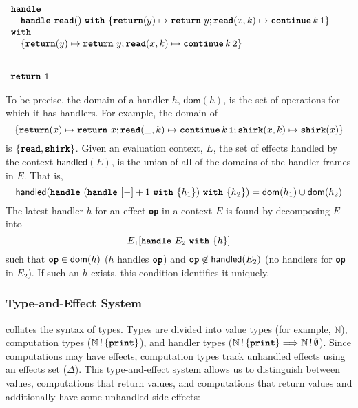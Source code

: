 \begin{eff}
$\begin{array}{l}
  \textbf{\texttt{handle}} \\
  \quad \handleWith{\textbf{\texttt{read}}()}{\returnHandler{y}{\return{y}}; \textbf{\texttt{read}}(x, k) \mapsto {\continue{k}{\texttt{1}}}} \\
  \textbf{\texttt{with}} \\ 
  \quad \{ \returnHandler{y}{\return{y}}; \textbf{\texttt{read}}(x, k) \mapsto {\continue{k}{\texttt{2}}} \}
\end{array}$ 

\vspace{2mm} 
\textcolor{effComment}{\hrule height 0.2mm \relax}
\vspace{2mm} 

\textcolor{effComment}{$\begin{array}{l}\return{\texttt{1}}\end{array}$}
\end{eff}

To be precise, the domain of a handler $h$, $\textsf{dom}(h)$, is the set of operations for which it has handlers. For example, the domain of 
\[\{ \returnHandler{x}{\return{x}}; \textbf{\texttt{read}}(\_, k) \mapsto \continue{k}{\texttt{1}}; \textbf{\texttt{shirk}}(x, k) \mapsto \textbf{\texttt{shirk}}(x)
\} \] 
is $\{ \textbf{\texttt{read}}, \textbf{\texttt{shirk}} \}$.
Given an evaluation context, $E$, the set of effects handled by the context $\textsf{handled}(E)$, is the union of all of the domains of the handler frames in $E$. That is, 
\[\textsf{handled}(\handleWith{(\handleWith{[-]+1}{h_1})}{h_2}) = \textsf{dom}(h_1) \cup \textsf{dom}(h_2)\]
The latest handler $h$ for an effect \textbf{\texttt{op}} in a context $E$ is found by decomposing $E$ into 
\[E_1[\handleWith{E_2}{h}]\]
such that $\textbf{\texttt{op}} \in \textsf{dom}(h)$ ($h$ handles $\textbf{\texttt{op}}$) and $\textbf{\texttt{op}} \not\in \textsf{handled}(E_2)$ (no handlers for \textbf{\texttt{op}} in $E_2$). If such an $h$ exists, this condition identifies it uniquely. 
\subsubsection{Type-and-Effect System}
 collates the syntax of \efflang{} types. Types are divided into value types (for example, $\mathbb{N}$), computation types ($\effectType[\{\textbf{\texttt{print}} \}]{\mathbb{N}}$), and handler types ($\handlerType{\effectType[\{\textbf{\texttt{print}} \}]{\mathbb{N}}}{\effectType[\emptyset]{\mathbb{N}}}$). Since computations may have effects, computation types track unhandled effects using an effects set ($\Delta$). This type-and-effect system allows us to distinguish between values, computations that return values, and computations that return values and additionally have some unhandled side effects:


